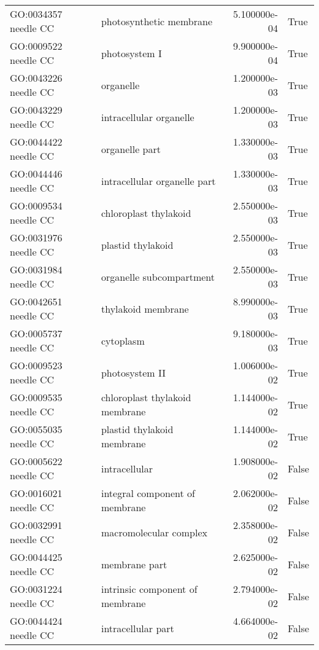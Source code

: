 \begin{tabular}{llrl}
GO:0034357 needle CC       &                      photosynthetic membrane &   5.100000e-04 &   True \\
GO:0009522 needle CC       &                                photosystem I &   9.900000e-04 &   True \\
GO:0043226 needle CC       &                                    organelle &   1.200000e-03 &   True \\
GO:0043229 needle CC       &                      intracellular organelle &   1.200000e-03 &   True \\
GO:0044422 needle CC       &                               organelle part &   1.330000e-03 &   True \\
GO:0044446 needle CC       &                 intracellular organelle part &   1.330000e-03 &   True \\
GO:0009534 needle CC       &                        chloroplast thylakoid &   2.550000e-03 &   True \\
GO:0031976 needle CC       &                            plastid thylakoid &   2.550000e-03 &   True \\
GO:0031984 needle CC       &                     organelle subcompartment &   2.550000e-03 &   True \\
GO:0042651 needle CC       &                           thylakoid membrane &   8.990000e-03 &   True \\
GO:0005737 needle CC       &                                    cytoplasm &   9.180000e-03 &   True \\
GO:0009523 needle CC       &                               photosystem II &   1.006000e-02 &   True \\
GO:0009535 needle CC       &               chloroplast thylakoid membrane &   1.144000e-02 &   True \\
GO:0055035 needle CC       &                   plastid thylakoid membrane &   1.144000e-02 &   True \\
GO:0005622 needle CC       &                                intracellular &   1.908000e-02 &  False \\
GO:0016021 needle CC       &               integral component of membrane &   2.062000e-02 &  False \\
GO:0032991 needle CC       &                       macromolecular complex &   2.358000e-02 &  False \\
GO:0044425 needle CC       &                                membrane part &   2.625000e-02 &  False \\
GO:0031224 needle CC       &              intrinsic component of membrane &   2.794000e-02 &  False \\
GO:0044424 needle CC       &                           intracellular part &   4.664000e-02 &  False \\
\bottomrule
\end{tabular}

